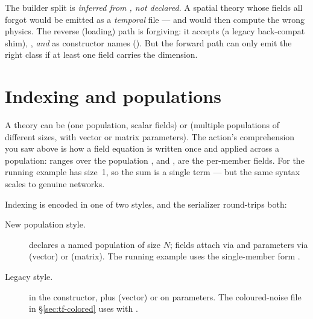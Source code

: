 \begin{gotcha}
The builder split is \emph{inferred from , not declared}. A
spatial theory whose fields all forgot  would be emitted as a
\emph{temporal} file --- and would then compute the wrong physics. The reverse
(loading) path is forgiving: it accepts  (a legacy
back-compat shim), , \emph{and}
 as constructor names
(). But the forward path can only
emit the right class if at least one field carries the dimension.
\end{gotcha}

\section{Indexing and populations}\label{sec:tf-indexing}

A theory can be  (one population, scalar fields) or
 (multiple populations of different sizes, with vector or
matrix parameters). The action's  comprehension you
saw above is how a field equation is written once and applied across a
population:  ranges over the population , and ,
 are the per-member fields. For the running example  has
size~1, so the sum is a single term --- but the same syntax scales to genuine
networks.

Indexing is encoded in one of two styles, and the serializer round-trips both:

\begin{description}
  \item[New population style.]  declares a named
        population of size $N$; fields attach via  and
        parameters via  (vector) or
         (matrix). The running example uses the
        single-member form .
  \item[Legacy style.]  in the constructor, plus
         (vector) or  on parameters. The
        coloured-noise file in \S\ref{sec:tf-colored} uses
         with
        .
\end{description}

